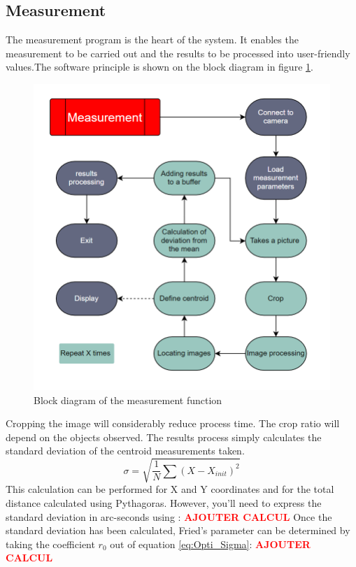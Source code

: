 \subsection{Measurement}
The measurement program is the heart of the system. It enables the measurement to be carried out and the results to be
processed into user-friendly values.The software principle is shown on the block diagram in figure \ref{fig:Soft_Meas}.
\begin{figure}[H]
    \centering
    \includegraphics[scale=0.85]{assets/figures/Software/Measurement.png}
    \caption{Block diagram of the measurement function}
    \label{fig:Soft_Meas}
\end{figure}
Cropping the image will considerably reduce process time. The crop ratio will depend on the objects observed.
\bigbreak
The results process simply calculates the standard deviation of the centroid measurements taken.
\begin{equation}
    \sigma = \sqrt{\frac{1}{N}\sum\left(X-X_{init}\right)^2}
\end{equation}
This calculation can be performed for X and Y coordinates and for the total distance calculated using Pythagoras.
However, you'll need to express the standard deviation in arc-seconds using :
\textbf{\textcolor{red}{AJOUTER CALCUL}}
\newline
Once the standard deviation has been calculated, Fried's parameter can be determined by taking the coefficient $r_0$ out of
equation \ref{eq:Opti_Sigma}:
\textbf{\textcolor{red}{AJOUTER CALCUL}}
\newpage
